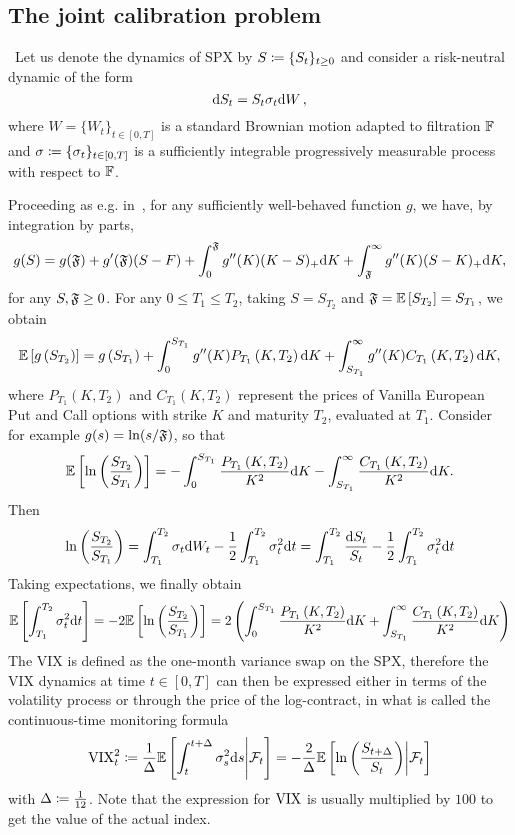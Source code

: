 \subsection{The joint calibration problem}\
Let us denote the dynamics of SPX by $S\coloneqq\{S_t\}_{t\geq 0}$ and consider a risk-neutral dynamic of the form
\[
\mathrm{d} S_t = S_t \sigma_t \mathrm{d} W\,,
\]
where $W=\{W_t\}_{t\in[0,T]}$ is a standard Brownian motion adapted to filtration $\mathbb{F}$ and $\sigma\coloneqq\{\sigma_t\}_{t\in[0,T]}$ is a sufficiently integrable progressively measurable process with respect to $\mathbb{F}$. 

Proceeding as e.g. in~\cite[Chapter~11]{Gatheral2006TheGuide}, for any sufficiently well-behaved function $g$, we have, by integration by parts,
$$
g(S)=g(\mathfrak{F})+g'(\mathfrak{F})(S-F)+\int_0^{\mathfrak{F}} g''(K)(K-S)_{+} \mathrm{d} K+\int_{\mathfrak{F}}^{\infty} g''(K)(S-K)_{+} \mathrm{d} K,
$$
for any $S, \mathfrak{F} \geq 0$. For any $0 \leq T_1 \leq T_2$, taking $S=S_{T_2}$ and $\mathfrak{F} = \mathbb{E}\left[S_{T_2}\right]=S_{T_1}$, we obtain
$$
\mathbb{E}\left[g\left(S_{T_2}\right)\right]=g\left(S_{T_1}\right)+\int_0^{S_{T_1}} g''(K) P_{T_1}\left(K, T_2\right) \mathrm{d} K+\int_{S_{T_1}}^{\infty} g''(K) C_{T_1}\left(K, T_2\right) \mathrm{d} K,
$$
where $P_{T_1}\left(K, T_2\right)$ and $C_{T_1}\left(K, T_2\right)$ represent the prices of Vanilla European Put and Call options with strike $K$ and maturity $T_2$, evaluated at $T_1$. Consider for example $g(s)=\ln (s / \mathfrak{F})$, so that
$$
\mathbb{E}\left[\ln \left(\frac{S_{T_2}}{S_{T_1}}\right)\right]=-\int_0^{S_{T_1}} \frac{P_{T_1}\left(K, T_2\right)}{K^2} \mathrm{d} K-\int_{S_{T_1}}^{\infty} \frac{C_{T_1}\left(K, T_2\right)}{K^2} \mathrm{d} K .
$$
Then
$$
\ln \left(\frac{S_{T_2}}{S_{T_1}}\right)=\int_{T_1}^{T_2} \sigma_t \mathrm{d} W_t-\frac{1}{2} \int_{T_1}^{T_2} \sigma_t^2 \mathrm{d} t=\int_{T_1}^{T_2} \frac{\mathrm{d} S_t}{S_t}-\frac{1}{2} \int_{T_1}^{T_2} \sigma_t^2 \mathrm{d} t
$$
Taking expectations, we finally obtain
\[
\mathbb{E}\left[\int_{T_1}^{T_2} \sigma_t^2 \mathrm{d} t\right]=-2 \mathbb{E}\left[\ln \left(\frac{S_{T_2}}{S_{T_1}}\right)\right]=2\left(\int_0^{S_{T_1}} \frac{P_{T_1}\left(K, T_2\right)}{K^2} \mathrm{d} K+\int_{S_{T_1}}^{\infty} \frac{C_{T_1}\left(K, T_2\right)}{K^2} \mathrm{d} K\right)
\]
The VIX is defined as the one-month variance swap on the SPX, therefore the VIX dynamics at time $t\in[0, T]$ can then be expressed either in terms of the volatility process or through the price of the log-contract, in what is called the continuous-time monitoring formula
\begin{equation*}
\mathrm{VIX}_{t}^{2} \coloneqq \frac{1}{\Delta} \mathbb{E}\left[\int_{t}^{t+\Delta} \sigma^2_{s} \mathrm{d} s\middle\vert\mathcal{F}_t \right] = -\frac{2}{\Delta}\mathbb{E} \left[\ln\left(\frac{S_{t+\Delta}}{S_t} \right) \middle\vert\mathcal{F}_t \right] \label{eq:VIXdef}
\end{equation*}
with $\Delta\coloneqq\frac{1}{12}$. Note that the expression for $\mathrm{VIX}$ is usually multiplied by $100$ to get the value of the actual index. 

